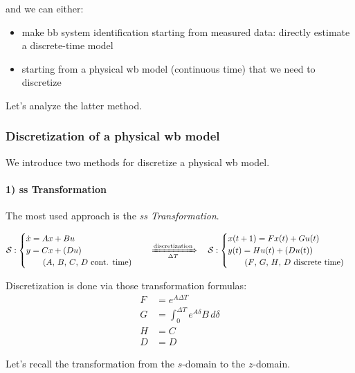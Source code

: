 \begin{appendices}
and we can either:

\begin{itemize}
    \item make \gls{bb} system identification starting from measured data: directly estimate a discrete-time model
    \item starting from a physical \gls{wb} model (continuous time) that we need to discretize 
\end{itemize}

Let's analyze the latter method.

\subsubsection*{Discretization of a physical \gls{wb} model}
We introduce two methods for discretize a physical \gls{wb} model.

\paragraph{1) \acrlong{ss} Transformation}

The most used approach is the \emph{\acrlong{ss} Transformation}.

\[
    \mathcal{S}: \begin{cases}
        \dot{x} = Ax + Bu \\
        y = Cx + (Du) \\
        \qquad \text{($A$, $B$, $C$, $D$ cont. time)}
    \end{cases}
    \quad
    \xRightarrow[\Delta T]{\text{discretization}}
    \quad
    \mathcal{S}: \begin{cases}
        x(t+1) = Fx(t) + Gu(t) \\
        y(t) = Hu(t) + (Du(t)) \\
        \qquad \text{($F$, $G$, $H$, $D$ discrete time)}
    \end{cases}
\]

Discretization is done via those transformation formulas:
\begin{align*}
    F &= e^{A\Delta T} \\
    G &= \int_0^{\Delta T} e^{A\delta}B\, d\delta \\
    H &= C \\
    D &= D
\end{align*}

\begin{recall}[$s$-domain] Let's recall the transformation from the $s$-domain to the $z$-domain.
	

\end{recall}
\end{appendices}
